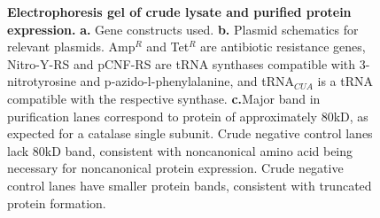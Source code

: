 \documentclass[journal=jacsat,manuscript=article]{achemso}
\begin{document}
\begin{figure}[h!]
\begin{subfigure}{\textwidth}
  \end{subfigure}
  \caption{\textbf{Electrophoresis gel of crude lysate and purified protein expression.} \textbf{a.} Gene constructs used. \textbf{b.} Plasmid schematics for relevant plasmids. Amp$^R$ and Tet$^R$ are antibiotic resistance genes, Nitro-Y-RS and pCNF-RS are tRNA synthases compatible with 3-nitrotyrosine and p-azido-l-phenylalanine, and tRNA$_{CUA}$ is a tRNA compatible with the respective synthase. \textbf{c.}Major band in purification lanes correspond to protein of approximately 80kD, as expected for a catalase single subunit. Crude negative control lanes lack 80kD band, consistent with noncanonical amino acid being necessary for noncanonical protein expression. Crude negative control lanes have smaller protein bands, consistent with truncated protein formation.}
\label{fig:pure-gel}
\end{figure}



\end{document}
